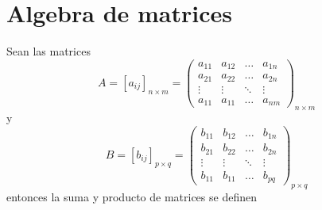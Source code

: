 \documentclass[
  11pt,
]{krantz}
\theoremstyle{definition}
\theoremstyle{definition}
\theoremstyle{definition}
\theoremstyle{definition}
\theoremstyle{remark}
\begin{document}
\hypertarget{algebra-de-matrices}{%
\section{Algebra de matrices}\label{algebra-de-matrices}}

Sean las matrices \[A=[a_{ij}]_{n\times m}=\begin{pmatrix}
a_{11}&a_{12}&\ldots&a_{1n}\\
a_{21}&a_{22}&\ldots&a_{2n}\\
\vdots & \vdots & \ddots &\vdots \\
a_{11}&a_{11}&\ldots&a_{nm}
\end{pmatrix}_{n\times m}\] y \[B=[b_{ij}]_{p\times q}=\begin{pmatrix}
b_{11}&b_{12}&\ldots&b_{1n}\\
b_{21}&b_{22}&\ldots&b_{2n}\\
\vdots & \vdots & \ddots &\vdots \\
b_{11}&b_{11}&\ldots&b_{pq}
\end{pmatrix}_{p\times q}\] entonces la suma y producto de matrices se definen
\end{document}
